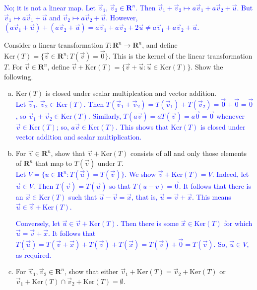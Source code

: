 \documentclass[a4paper,11pt]{article}
\newcommand{\R}{\mathbf{R}}
\newcommand{\BB}[1]{\textcolor{blue}{#1}}
\begin{document}
\BB{No; it is not a linear map. Let $\vec v_1,\,\vec v_2 \in \R^n$. Then $\vec
  v_1+\vec v_2 \mapsto a\vec v_1+a\vec v_2+\vec u$. But $\vec v_1 \mapsto a\vec
  v_1+\vec u$ and $\vec v_2 \mapsto a\vec v_2+\vec u$. However, $(a\vec v_1+\vec
  u)+(a\vec v_2+\vec u)=a\vec v_1+a\vec v_2+2\vec u \neq a\vec v_1+a\vec
  v_2+\vec u$. \\}

 Consider a linear transformation $T: \R^n
\rightarrow \R^n$, and define $\text{Ker}(T)=\{\vec v \in \R^n : T(\vec v)=\vec
0\}$. This is the kernel of the linear transformation $T$. For $\vec v \in
\R^n$, define $\vec v + \text{Ker}(T)=\{\vec v + \vec u : \vec u \in
\text{Ker}(T)\}$. Show the following.
\begin{enumerate}[(a)]
\item $\text{Ker}(T)$ is closed under scalar multiplcation and vector addition.\\

  \BB{Let $\vec v_1,\,\vec v_2 \in \text{Ker}(T)$. Then $T(\vec v_1+\vec
    v_2)=T(\vec v_1)+T(\vec v_2)=\vec 0+\vec 0=\vec 0$, so $\vec v_1+\vec v_2
    \in \text{Ker}(T)$. Similarly, $T(a\vec v)=aT(\vec v)=a\vec 0=\vec 0$
    whenever $\vec v \in \text{Ker}(T)$; so, $a\vec v \in \text{Ker}(T)$. This
    shows that $\text{Ker}(T)$ is closed under vector addition and scalar
    multiplication. \\}
  
\item For $\vec v \in \R^n$, show that $\vec v + \text{Ker}(T)$ consists of all
  and only those elements of $\R^n$ that map to $T(\vec v)$ under $T$. \\

  \BB{Let $V=\{u \in \R^n : T(\vec u)=T(\vec v)\}$. We show $\vec
    v+\text{Ker}(T)=V$. Indeed, let $\vec u \in V$. Then $T(\vec v)=T(\vec u)$
    so that $T(u-v)=\vec 0$. It follows that there is an $\vec x \in
    \text{Ker}(T)$ such that $\vec u-\vec v=\vec x$, that is, $\vec u=\vec
    v+\vec x$. This means $\vec u \in \vec v+\text{Ker}(T)$.}

  \BB{Conversely, let $\vec u \in \vec v+\text{Ker}(T)$. Then there is some
    $\vec x \in \text{Ker}(T)$ for which $\vec u=\vec v+\vec x.$ It follows that
  $T(\vec u)=T(\vec v+\vec x)+T(\vec v)+T(\vec x)=T(\vec v)+\vec 0=T(\vec v)$.
  So, $\vec u \in V$, as required. \\}

\item For $\vec v_1,\vec v_2 \in \R^n$, show that either $\vec
  v_1+\text{Ker}(T)=\vec v_2 +\text{Ker}(T)$ or $\vec v_1+\text{Ker}(T) \cap
  \vec v_2 +\text{Ker}(T)=\emptyset$. \\


\end{enumerate}
\end{document}

